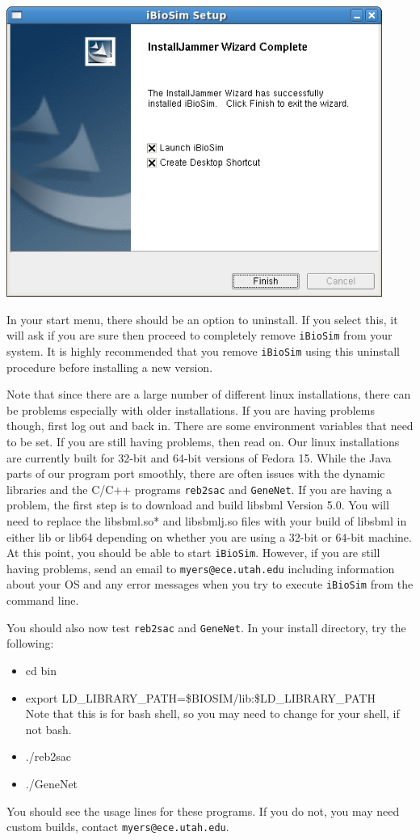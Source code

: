 \documentclass[titlepage,11pt]{article}
\begin{document}
\includegraphics[height=95mm]{screenshots/finish}

In your start menu, there should be an option to uninstall.  If you
select this, it will ask if you are sure then proceed to completely
remove {\tt iBioSim} from your system.  It is highly recommended that
you remove {\tt iBioSim} using this uninstall procedure before
installing a new version.

Note that since there are a large number of different linux installations, there can be problems especially with older installations.  If you are having problems though, first log out and back in.  There are some environment variables that need to be set.  If you are still having problems, then read on.
Our linux installations are currently built for 32-bit and 64-bit versions of Fedora 15.  While the Java parts of our program port smoothly, there are often issues with the dynamic libraries and the C/C++ programs {\tt reb2sac} and {\tt GeneNet}.  If you are having a problem, the first step is to download and build libsbml Version 5.0.  You will need to replace the libsbml.so* and libsbmlj.so files with your build of libsbml in either lib or lib64 depending on whether you are using a 32-bit or 64-bit machine.  At this point, you should be able to start {\tt iBioSim}.  However, if you are still having problems, send an email to {\tt myers@ece.utah.edu} including information about your OS and any error messages when you try to execute {\tt iBioSim} from the command line.

You should also now test {\tt reb2sac} and {\tt GeneNet}.  In your install directory, try the following:
\begin{itemize}
\item cd bin
\item export LD\_LIBRARY\_PATH=\$BIOSIM/lib:\$LD\_LIBRARY\_PATH \\
Note that this is for bash shell, so you may need to change for your shell, if not bash.
\item ./reb2sac
\item ./GeneNet
\end{itemize}
You should see the usage lines for these programs.  If you do not, you may need custom builds, contact {\tt myers@ece.utah.edu}.
\end{document}

